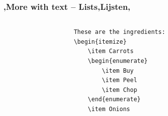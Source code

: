 \begin{frame}[fragile]
    \frametitle{\lang,More with text -- Lists,Lijsten,}
    
    \begin{columns}
        \begin{column}{0.5\textwidth}
            \begin{codebox}
                \begin{verbatim}
                    These are the ingredients:
                    \begin{itemize}
                        \item Carrots
                        \begin{enumerate}
                            \item Buy
                            \item Peel
                            \item Chop
                        \end{enumerate}
                        \item Onions
                        

\end{verbatim}
\end{codebox}
\end{column}
\end{columns}
\end{frame}
